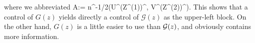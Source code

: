  where we abbreviated 
 \be\label{abbr_A}
 A:= n^{-1/2}(\Lambda U^\top (Z^{(1)})^\top, V^\top (Z^{(2)})^\top).
 \ee 
 This shows that a control of $G(z)$ yields directly a control of $\mathcal G(z)$ as the upper-left block. On the other hand, $G(z)$ is a little  easier to use than $\cal G(z)$, and obviously contains more information.




